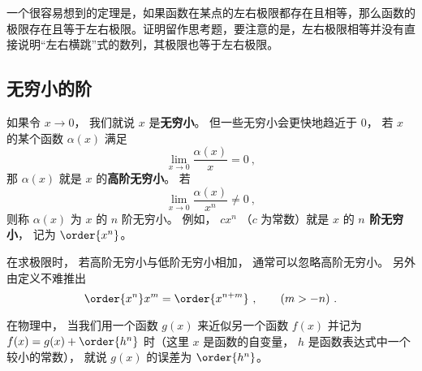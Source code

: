 一个很容易想到的定理是，如果函数在某点的左右极限都存在且相等，那么函数的极限存在且等于左右极限。证明留作思考题，要注意的是，左右极限相等并没有直接说明“左右横跳”式的数列，其极限也等于左右极限。





\subsection{无穷小的阶}\label{sub_Lim_1}
如果令 $x\to 0$， 我们就说 $x$ 是\textbf{无穷小}。 但一些无穷小会更快地趋近于 $0$， 若 $x$ 的某个函数 $\alpha(x)$ 满足
\begin{equation}
\lim_{x\to 0} \frac{\alpha(x)}{x} = 0~,
\end{equation}
那 $\alpha(x)$ 就是 $x$ 的\textbf{高阶无穷小}。 若
\begin{equation}
\lim_{x\to 0} \frac{\alpha(x)}{x^n} \ne 0~,
\end{equation}
则称 $\alpha(x)$ 为 $x$ 的 $n$ 阶无穷小。 例如， $c x^n$ （$c$ 为常数）就是 $x$ 的 \textbf{$n$ 阶无穷小}， 记为 $\order{x^n}$。

在求极限时， 若高阶无穷小与低阶无穷小相加， 通常可以忽略高阶无穷小。 另外由定义不难推出
\begin{equation}
\order{x^n} x^m = \order{x^{n + m}}~,\qquad (m > -n)~.
\end{equation}

在物理中， 当我们用一个函数 $g(x)$ 来近似另一个函数 $f(x)$ 并记为 $f(x) = g(x) + \order{h^n}$ 时（这里 $x$ 是函数的自变量， $h$ 是函数表达式中一个较小的常数）， 就说 $g(x)$ 的误差为 $\order{h^n}$。
